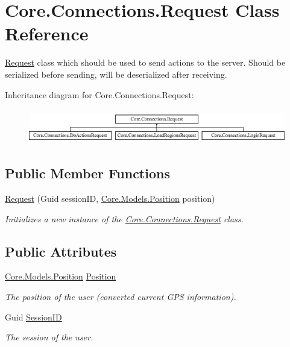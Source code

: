 \hypertarget{classCore_1_1Connections_1_1Request}{}\section{Core.\+Connections.\+Request Class Reference}
\label{classCore_1_1Connections_1_1Request}


\hyperlink{classCore_1_1Connections_1_1Request}{Request} class which should be used to send actions to the server. Should be serialized before sending, will be deserialized after receiving.  


Inheritance diagram for Core.\+Connections.\+Request\+:\begin{figure}[H]
\begin{center}
\leavevmode
\includegraphics[height=1.536351cm]{classCore_1_1Connections_1_1Request}
\end{center}
\end{figure}
\subsection*{Public Member Functions}
\begin{DoxyCompactItemize}
\item 
\hyperlink{classCore_1_1Connections_1_1Request_a36b5ac4c812551bebd3310f1f54bb79e}{Request} (Guid session\+I\+D, \hyperlink{classCore_1_1Models_1_1Position}{Core.\+Models.\+Position} position)
\begin{DoxyCompactList}\small\item\em Initializes a new instance of the \hyperlink{classCore_1_1Connections_1_1Request}{Core.\+Connections.\+Request} class. \end{DoxyCompactList}\end{DoxyCompactItemize}
\subsection*{Public Attributes}
\begin{DoxyCompactItemize}
\item 
\hyperlink{classCore_1_1Models_1_1Position}{Core.\+Models.\+Position} \hyperlink{classCore_1_1Connections_1_1Request_a1aaa165e5028fe5a7baab44d6306cbee}{Position}
\begin{DoxyCompactList}\small\item\em The position of the user (converted current G\+P\+S information). \end{DoxyCompactList}\item 
Guid \hyperlink{classCore_1_1Connections_1_1Request_a19082721a0c3785a77691cb3bec7dd42}{Session\+I\+D}
\begin{DoxyCompactList}\small\item\em The session of the user. \end{DoxyCompactList}\end{DoxyCompactItemize}


